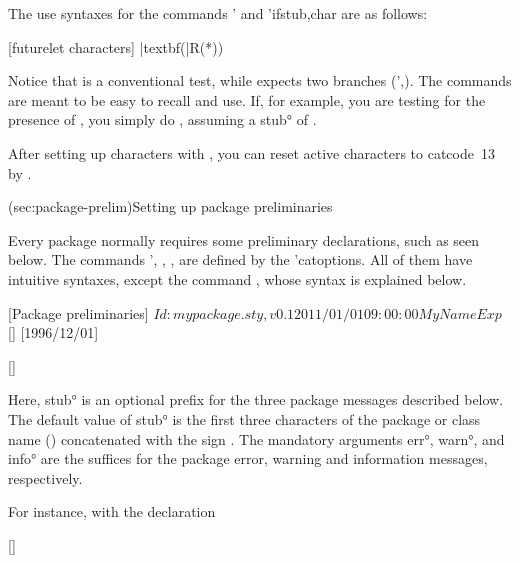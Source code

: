 \documentclass[
  use-a4-paper,
  use-10pt-font,
  final-version,
  use-UK-English,
  fancy-section-headings,
  frame-section-numbers,
  para-abstract-style,
  input-config-file,
  no-hyperref-messages
]{amltxdoc}
\begin{document}
The use syntaxes for the commands \fnl*' and \fnl*'{\bs if}{stub,char} are as follows:

[futurelet characters]
\futurelet\next\cmd |textbf(|R(*))
\def\cmd{\ifx\fl@star\next `I saw star'\else `I didn't see star'\fi}
\def\cmd{\iffl@star\next{`I saw star'}{`I didn't see star'}}

Notice that \fx{\ifx\fl@comma\next} is a conventional \tex test, while  expects two \latex branches (\ffx'{\@firstoftwo,\@secondoftwo}). The commands are meant to be easy to recall and use. If, for example, you are testing for the presence of \fx{\tilde}, you simply do , assuming a \ang{stub} of .

After setting up \fx{\futurelet} characters with \fx{\cptfutureletsetup}, you can reset active characters to catcode~13 by \fx{\futureletresetactives}.


\docsection(sec:package-prelim){Setting up package preliminaries}

Every package normally requires some preliminary declarations, such as seen below. The commands \ffx'{\StyleFilePurpose, \StyleFileRCSInfo, \StyleFileInfo, \SetStyleFileMessages} are defined by the \pkg'{catoptions}. All of them have intuitive syntaxes, except the command \fx{\SetStyleFileMessages}, whose syntax is explained below.

[Package preliminaries]
\StyleFileRCSInfo
$Id: mypackage.sty,v 0.1 2011/01/01 09:00:00 My Name Exp $
[\StyleFileInfo]
[1996/12/01]

[\SetStyleFileMessages]
\fxim*{\SetStyleFileMessages}

Here, \ang{stub} is an optional prefix for the three package messages described below. The default value of \ang{stub} is the first three characters of the package or class name (\hx{\@currname}) concatenated with the  sign . The mandatory arguments \ang{err}, \ang{warn}, and \ang{info} are the suffices for the package error, warning and information messages, respectively.

For instance, with the declaration

[\SetStyleFileMessages]
\end{document}
